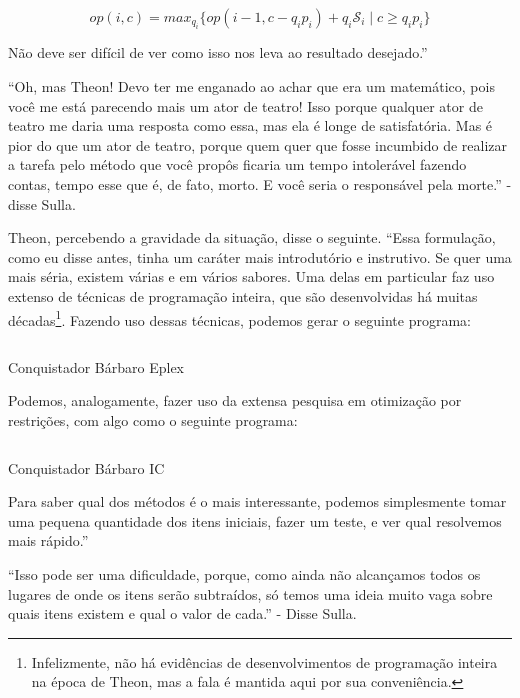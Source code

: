 \documentclass{article}
\begin{document}
\[
  op(i,c) =
    max_{q_i}\{op(i-1, c-q_i p_i) + q_i \mathscr{S}_i\; |\; c \geq q_i p_i\}
\]

Não deve ser difícil de ver como isso nos leva ao resultado desejado.''

``Oh, mas Theon! Devo ter me enganado ao achar que era um matemático, pois você me está parecendo
  mais um ator de teatro! Isso porque qualquer ator de teatro me daria uma resposta como essa, mas
  ela é longe de satisfatória. Mas é pior do que um ator de teatro, porque quem quer que fosse
  incumbido de realizar a tarefa pelo método que você propôs ficaria um tempo intolerável fazendo
  contas, tempo esse que é, de fato, morto.
  E você seria o responsável pela morte.'' - disse Sulla.

  Theon, percebendo a gravidade da situação, disse o seguinte. ``Essa formulação, como eu disse
  antes, tinha um caráter mais introdutório e instrutivo. Se quer uma mais séria, existem várias e
  em vários sabores. Uma delas em particular faz uso extenso de técnicas de programação inteira, que
  são desenvolvidas há muitas décadas\footnote{Infelizmente, não há evidências de desenvolvimentos de
  programação inteira na época de Theon, mas a fala é mantida aqui por sua conveniência.}. Fazendo
  uso dessas técnicas, podemos gerar o seguinte programa:

  \begin{listing}
    \inputminted{prolog}{../Exemplos/Cap12/prog1-knapSackEplex.ecl}
    \caption{Conquistador Bárbaro Eplex}\label{lst:knapsackEplex}
  \end{listing}

  Podemos, analogamente, fazer uso da extensa pesquisa em otimização por restrições, com algo como o
  seguinte programa:

  \begin{listing}[H]
    \inputminted{prolog}{../Exemplos/Cap12/prog2-knapSackIc.ecl}
    \caption{Conquistador Bárbaro IC}\label{lst:knapsackIC}
  \end{listing}

  Para saber qual dos métodos é o mais interessante, podemos simplesmente tomar uma pequena quantidade dos itens
  iniciais, fazer um teste, e ver qual resolvemos mais rápido.''

  ``Isso pode ser uma dificuldade, porque, como ainda não alcançamos todos os lugares de onde os
  itens serão subtraídos, só temos uma ideia muito vaga sobre quais itens existem e qual o valor de
  cada.'' - Disse Sulla.
\end{document}
